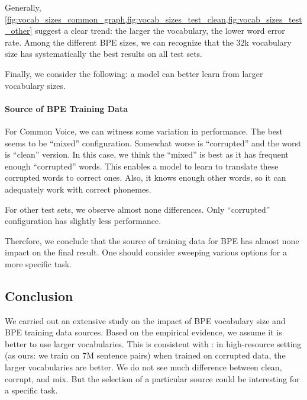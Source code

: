 Generally, \cref{fig:vocab_sizes_common_graph,fig:vocab_sizes_test_clean,fig:vocab_sizes_test_other} suggest a clear trend: the larger the vocabulary, the lower word error rate. Among the different BPE sizes, we can recognize that the 32k vocabulary size has systematically the best results on all test sets.

Finally, we consider the following: a model can better learn from larger vocabulary sizes. 

\paragraph{Source of BPE Training Data}
For Common Voice, we can witness some variation in performance. The best seems to be ``mixed'' configuration. Somewhat worse is ``corrupted'' and the worst is ``clean'' version. In this case, we think the ``mixed'' is best as it has frequent enough ``corrupted'' words. This enables a model to learn to translate these corrupted words to correct ones. Also, it knows enough other words, so it can adequately work with correct phonemes.

For other test sets, we observe almost none differences. Only ``corrupted'' configuration has slightly less performance. 

Therefore, we conclude that the source of training data for BPE has almost none impact on the final result. One should consider sweeping various options for a more specific task.

\subsection{Conclusion}
\label{easr:tok_conclusion}
We carried out an extensive study on the impact of BPE vocabulary size and BPE training data sources. Based on the empirical evidence, we assume it is better to use larger vocabularies. This is consistent with : in high-resource setting (as ours: we train on 7M sentence pairs) when trained on corrupted data, the larger vocabularies are better. We do not see much difference between clean, corrupt, and mix. But the selection of a particular source could be interesting for a specific task.

